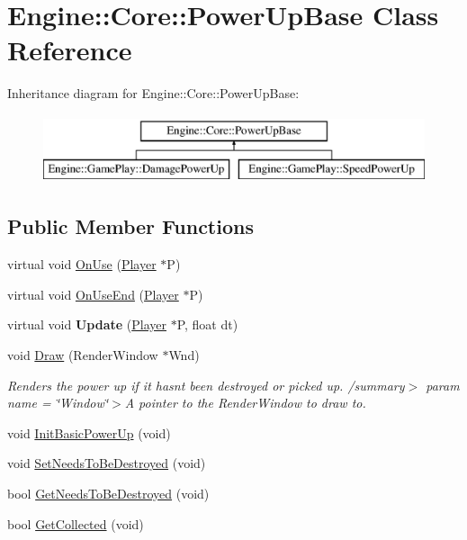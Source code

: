 \hypertarget{class_engine_1_1_core_1_1_power_up_base}{}\section{Engine\+:\+:Core\+:\+:Power\+Up\+Base Class Reference}
\label{class_engine_1_1_core_1_1_power_up_base}
Inheritance diagram for Engine\+:\+:Core\+:\+:Power\+Up\+Base\+:\begin{figure}[H]
\begin{center}
\leavevmode
\includegraphics[height=2.000000cm]{class_engine_1_1_core_1_1_power_up_base}
\end{center}
\end{figure}
\subsection*{Public Member Functions}
\begin{DoxyCompactItemize}
\item 
virtual void \hyperlink{class_engine_1_1_core_1_1_power_up_base_a1c93516694b752a8ebc42eb181cb2b78}{On\+Use} (\hyperlink{class_engine_1_1_game_play_1_1_player}{Player} $\ast$P)
\item 
virtual void \hyperlink{class_engine_1_1_core_1_1_power_up_base_a195aecea60afdb99add60661a1c95697}{On\+Use\+End} (\hyperlink{class_engine_1_1_game_play_1_1_player}{Player} $\ast$P)
\item 
\mbox{\label{class_engine_1_1_core_1_1_power_up_base_a77f94a6dcfbc04d7f3156ef23153872d}} 
virtual void {\bfseries Update} (\hyperlink{class_engine_1_1_game_play_1_1_player}{Player} $\ast$P, float dt)
\item 
void \hyperlink{class_engine_1_1_core_1_1_power_up_base_a5d145e5909ed25fb656416fe10ba7052}{Draw} (Render\+Window $\ast$Wnd)
\begin{DoxyCompactList}\small\item\em Renders the power up if it hasn\textquotesingle{}t been destroyed or picked up. /summary$>$ param name = \char`\"{}\+Window\char`\"{}$>$A pointer to the Render\+Window to draw to.\end{DoxyCompactList}\item 
void \hyperlink{class_engine_1_1_core_1_1_power_up_base_aa60b222fd4cd9be0b8fcca5e06ba4c62}{Init\+Basic\+Power\+Up} (void)
\item 
void \hyperlink{class_engine_1_1_core_1_1_power_up_base_a8f6f5112493d25a67ec0c05e65691728}{Set\+Needs\+To\+Be\+Destroyed} (void)
\item 
bool \hyperlink{class_engine_1_1_core_1_1_power_up_base_a2b54cfc2afda10849a05f3095539c682}{Get\+Needs\+To\+Be\+Destroyed} (void)
\item 
bool \hyperlink{class_engine_1_1_core_1_1_power_up_base_a3a2b9ec8b5c8151afd2790bd54ce323e}{Get\+Collected} (void)
\end{DoxyCompactItemize}
